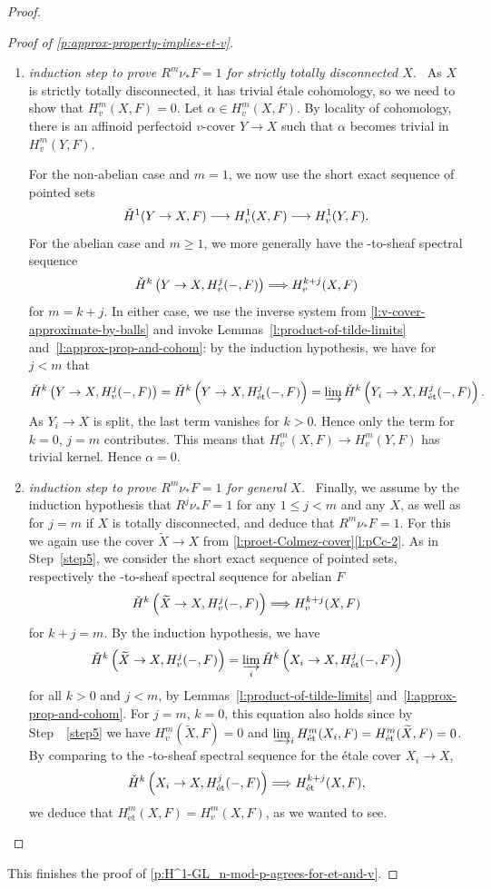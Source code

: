 \documentclass[11pt]{amsart}
\numberwithin{equation}{section}
\theoremstyle{definition}
\theoremstyle{remark}
\newcommand{\lra}{\longrightarrow}
\newcommand{\et}{{\operatorname{\acute{e}t}}}
\newcommand{\wt}{\widetilde}
\newcommand{\cH}{{\ifmmode \check{H}\else{\v{C}ech}\fi}}
\begin{document}
\begin{proof}
\begin{proof}[Proof of \cref{p:approx-property-implies-et-v}]
\begin{enumerate}[label={\emph{Step}~\arabic*:}, ref=\arabic*,wide]
\item\label{step5} \emph{induction step to prove $R^m\nu_{\ast}F=1$  for strictly totally disconnected $X$.}~	
		As $X$ is strictly totally disconnected, it has trivial \'etale cohomology, so we need to show that $H^m_{v}(X,F)=0$.
		Let $\alpha \in H^m_{v}(X,F)$. By locality of cohomology, there is an affinoid perfectoid $v$-cover $Y\to X$ such that $\alpha$ becomes trivial in $H^m_{v}(Y,F)$.  
		
		For the non-abelian case and $m=1$, we now use the short exact sequence of pointed sets
		\[ \cH^1(Y\to X,F)\lra H^{1}_v(X,F)\lra H^1_v(Y,F).\]
		For the abelian case and  $m\geq 1$, we more generally have the \cH-to-sheaf spectral sequence 
		\[ \cH^k\left(Y\to X,H^j_v(-,F)\right)\Longrightarrow H^{k+j}_v(X,F)\]
		for $m=k+j$. In either case, we use the inverse system from \cref{l:v-cover-approximate-by-balls} and invoke Lemmas~\ref{l:product-of-tilde-limits} and~\ref{l:approx-prop-and-cohom}: by the induction hypothesis,
                we have for $j<m$ that
		\[ \cH^k\left(Y\to X,H^j_v(-,F)\right)=\cH^k\left(Y\to X,H^j_{\et}(-,F)\right)=\varinjlim\cH^k\left(Y_i\to X,H^j_{\et}(-,F)\right).\]
		As $Y_i\to X$ is split, the last term vanishes for $k>0$. Hence only the term for $k=0$, $j=m$ contributes. This means that $H^{m}_v(X,F)\to H^m_v(Y,F)$
		has trivial kernel. Hence $\alpha=0$.
		
\item\label{step6} \emph{induction step to prove $R^m\nu_{\ast}F=1$  for general $X$.}~
  Finally, we assume by the induction hypothesis
  that $R^j\nu_{\ast}F=1$ for any $1\leq j< m$ and any $X$, as well as for $j=m$ if $X$ is totally disconnected, and deduce that $R^m\nu_{\ast}F=1$. For this we again use the cover $\wt X\to X$ from \cref{l:proet-Colmez-cover}\eqref{l:pCc-2}. As in Step~\ref{step5}, we consider the short exact sequence of pointed sets, respectively the \cH-to-sheaf spectral sequence for abelian $F$
		\[ \cH^k\left(\wt X\to X,H^j_v(-,F)\right)\Longrightarrow H^{k+j}_v(X,F)\]
		for $k+j=m$.
		By the induction hypothesis, we have
		\[ \cH^k\left(\wt X\to X,H^j_v(-,F)\right)=\varinjlim_i  \cH^k\left(X_i\to X,H^j_{\et}(-,F)\right)\]
		for all $k>0$ and $j<m$, by Lemmas~\ref{l:product-of-tilde-limits} and~\ref{l:approx-prop-and-cohom}. For $j=m$, $k=0$, this equation also holds since by Step~~\ref{step5} we have $H^m_v(\wt X,F)=0$ and $\varinjlim_iH^m_{\et}(X_i,F)=H^m_{\et}(\wt X,F)=0$.  By comparing to the \cH-to-sheaf spectral sequence for the \'etale cover $X_i\to X$,
		\[ \cH^k\left(X_i\to X,H^j_{\et}(-,F)\right)\Longrightarrow H^{k+j}_{\et}(X,F),\]
		 we deduce that 
		 $H^{m}_{\et}(X,F)=H^{m}_v(X,F)$, as we wanted to see.\qedhere
                 \end{enumerate}
	\end{proof}
	
	This finishes the proof of \cref{p:H^1-GL_n-mod-p-agrees-for-et-and-v}.
\end{proof}
\end{document}
